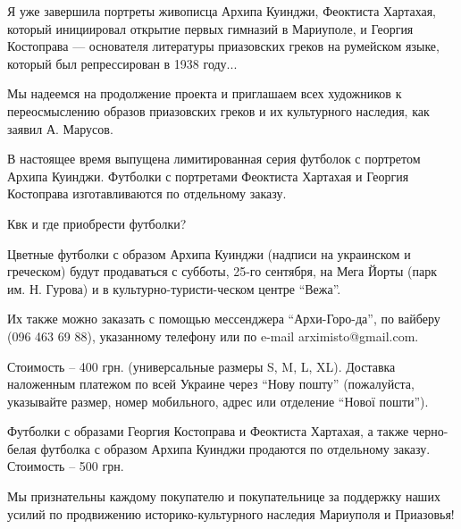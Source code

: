 Я уже завершила портреты живописца Архипа Куинджи, Феоктиста Хартахая, который
инициировал открытие первых гимназий в Мариуполе, и Георгия Костоправа —
основателя литературы приазовских греков на румейском языке, который был
репрессирован в 1938 году...

Мы надеемся на продолжение проекта и приглашаем всех художников к
переосмыслению образов приазовских греков и их культурного наследия, как заявил
А. Марусов.

В настоящее время выпущена лимитированная серия футболок с портретом Архипа
Куинджи. Футболки с портретами Феоктиста Хартахая и Георгия Костоправа
изготавливаются по отдельному заказу.

Квк и где приобрести футболки? 

Цветные футболки с образом Архипа Куинджи (надписи на украинском и греческом)
будут продаваться с субботы, 25-го сентября, на Мега Йорты (парк им. Н. Гурова)
и в культурно-туристи\hyp{}ческом центре \enquote{Вежа}.

Их также можно заказать с помощью мессенджера \enquote{Архи-Горо\hyp{}да}, по вайберу
(096 463 69 88), указанному телефону или по e-mail arximisto@gmail.com.

Стоимость – 400 грн. (универсальные размеры S, M, L, XL). Доставка наложенным
платежом по всей Украине через \enquote{Нову пошту} (пожалуйста, указывайте
размер, номер мобильного, адрес или отделение \enquote{Нової пошти}). 

Футболки с образами Георгия Костоправа и Феоктиста Хартахая, а также
черно-белая футболка с образом Архипа Куинджи продаются по отдельному заказу.
Стоимость – 500 грн.

Мы признательны каждому покупателю и покупательнице за поддержку наших усилий
по продвижению историко-культурного наследия Мариуполя и Приазовья!


